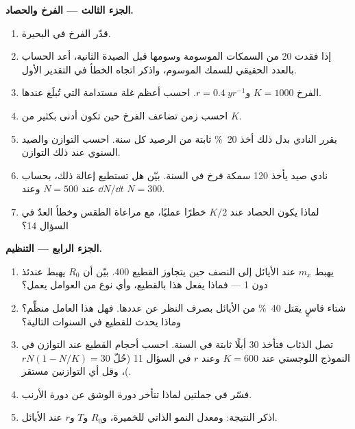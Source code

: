 \begin{problem}
\medskip
\noindent\textbf{الجزء الثالث --- الفرخ والحصاد.}
\begin{enumerate}[resume]
  \item قدّر  الفرخ في البحيرة.
  \item إذا فقدت 20 من السمكات الموسومة وسومها قبل الصيدة الثانية،
        أعد الحساب بالعدد الحقيقي للسمك الموسوم، واذكر اتجاه الخطأ
        في التقدير الأول.
  \item {} الفرخ $K = 1000$ و$r = \qty{0.4}{yr^{-1}}$.
        احسب أعظم غلة مستدامة  التي تُبلَغ عندها.
  \item احسب زمن تضاعف  الفرخ حين تكون أدنى بكثير من $K$.
  \item يقرر النادي بدل ذلك أخذ \qty{20}{\%} ثابتة من الرصيد كل
        سنة. احسب  التوازن والصيد السنوي عند ذلك التوازن.
  \item نادي صيد يأخذ 120 سمكة فرخ في السنة. بيّن هل تستطيع
         إعالة ذلك، بحساب $\dd N/\dd t$ عند $N =
        500$ وعند $N = 300$.
  \item لماذا يكون الحصاد عند $K/2$ خطرًا عمليًا، مع مراعاة الطقس
        وخطأ العدّ في السؤال 14؟
\end{enumerate}

\medskip
\noindent\textbf{الجزء الرابع --- التنظيم.}
\begin{enumerate}[resume]
  \item يهبط $m_x$ عند الأيائل إلى النصف حين يتجاوز القطيع 400.
        بيّن أن $R_0$ يهبط عندئذ دون 1 --- فماذا يفعل هذا بالقطيع،
        وأي نوع من العوامل يعمل؟
  \item شتاء قاسٍ يقتل \qty{40}{\%} من الأيائل بصرف النظر عن
        عددها. فهل هذا العامل منظِّم؟ وماذا يحدث للقطيع في السنوات
        التالية؟
  \item تصل الذئاب فتأخذ 30 أيلًا ثابتة في السنة. احسب أحجام
        القطيع عند التوازن في النموذج اللوجستي عند $K = 600$
        وعند $r$ في السؤال 11 (حُلّ $rN(1 - N/K) = 30$)، وقل
        أي التوازنين مستقر.
  \item فسّر في جملتين لماذا تتأخر دورة الوشق عن دورة الأرنب.
  \item اذكر النتيجة:  ومعدل النمو الذاتي للخميرة،
        و$R_0$ و$T$ و$r$ عند الأيائل.
\end{enumerate}
\end{problem}
